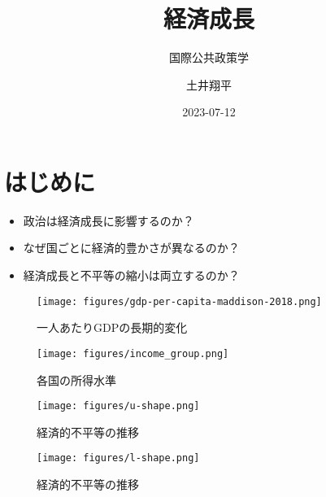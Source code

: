 \documentclass[
  xelatex,
  ja=standard]{bxjsarticle}
\title{経済成長}
\subtitle{国際公共政策学}
\author{土井翔平}
\date{2023-07-12}
\providecommand{\tightlist}{%
  \setlength{\itemsep}{0pt}\setlength{\parskip}{0pt}}\usepackage{longtable,booktabs,array}
\begin{document}
\maketitle
\ifdefined\Shaded\renewenvironment{Shaded}{\begin{tcolorbox}[interior hidden, enhanced, frame hidden, borderline west={3pt}{0pt}{shadecolor}, boxrule=0pt, breakable, sharp corners]}{\end{tcolorbox}}\fi

\hypertarget{ux306fux3058ux3081ux306b}{%
\section*{はじめに}\label{ux306fux3058ux3081ux306b}}

\begin{itemize}
\tightlist
\item
  政治は経済成長に影響するのか？
\item
  なぜ国ごとに経済的豊かさが異なるのか？
\item
  経済成長と不平等の縮小は両立するのか？
\end{itemize}

\begin{figure}[htpb]

{\centering \texttt{[image: figures/gdp-per-capita-maddison-2018.png]}

}

\caption{一人あたりGDPの長期的変化}

\end{figure}

\begin{figure}[htpb]

{\centering \texttt{[image: figures/income\_group.png]}

}

\caption{各国の所得水準}

\end{figure}

\begin{figure}[htpb]

{\centering \texttt{[image: figures/u-shape.png]}

}

\caption{経済的不平等の推移}

\end{figure}

\begin{figure}[htpb]

{\centering \texttt{[image: figures/l-shape.png]}

}

\caption{経済的不平等の推移}

\end{figure}
\end{document}
